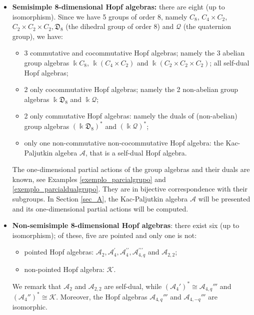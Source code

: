 \documentclass[reqno]{amsart}
\theoremstyle{definition}
\numberwithin{equation}{section}\theoremstyle{plain}
\theoremstyle{definition}
\def \k {\Bbbk}
\def \K {\mathcal{K}}
\def \A {\mathcal{A}}
\begin{document}
 \begin{itemize}
     \item \textbf{Semisimple 8-dimensional  Hopf algebras:} there are eight (up to isomorphism).    
     Since we have 5 groups of order 8, namely $C_8$, $C_4\times C_2$, $C_2\times C_2\times C_2, \mathfrak{D}_8$ (the dihedral group of order 8) and $\mathcal{Q}$ (the quaternion group), we have:
     \begin{itemize}
         \item 3 commutative and cocommutative Hopf algebras; namely the 3 abelian group algebras $\k C_8$, $\k(C_4\times C_2)$ and $\k(C_2\times C_2\times C_2)$; all self-dual Hopf algebras;
         \item 2 only cocommutative Hopf algebras; namely the 2 non-abelian group algebras $\k \mathfrak{D}_8$ and $\k \mathcal{Q}$;
         \item 2 only commutative Hopf algebras: namely the duals of (non-abelian) group algebras $(\k \mathfrak{D}_8)^*$ and $(\k \mathcal{Q})^*$;
         \item only one non-commutative non-cocommutative Hopf algebra: the Kac-Paljutkin algebra $\A$, that is a self-dual Hopf algebra. 
     \end{itemize}

\smallbreak 

     The one-dimensional partial actions of the group algebras and their duals are known, see Examples \ref{exemplo_parcialgrupo} and \ref{exemplo_parcialdualgrupo}. They are in bijective correspondence with their subgroups.
In Section \ref{sec_A}, the Kac-Paljutkin algebra $\A$ will be presented and its one-dimensional partial actions will be computed.

\medbreak

\item \textbf{Non-semisimple 8-dimensional Hopf algebras}:
there exist six (up to isomorphism); of these, five are pointed and only one is not:
\begin{itemize}
    \item pointed Hopf algebras: $\mathcal{A}_2, \mathcal{A}_4^\prime, \mathcal{A}_4^{\prime \prime}, \mathcal{A}_{4,q}^{\prime \prime \prime}$ and $\mathcal{A}_{2,2}$;
    \item non-pointed Hopf algebra: $\mathcal{K}$.
\end{itemize}


We remark that $\mathcal{A}_{2}$ and $\mathcal{A}_{2,2}$ are self-dual, while $(\mathcal{A}_{4}')^*\cong \mathcal{A}_{4,q}'''$ and $(\mathcal{A}_{4}'')^* \cong \K$.
Moreover, the Hopf algebras $\mathcal{A}_{4,q}'''$ and $\mathcal{A}_{4,-q}'''$ are isomorphic.


\end{itemize}
\end{document}
